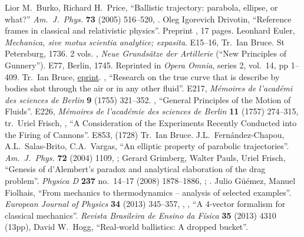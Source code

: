 \begin{thebibliography}{99}\footnotesize%
\setlength{\itemsep}{0pt plus 0.3ex}%
\setlength{\parskip}{0pt}
  Lior M.~Burko, Richard H.~Price,
  ``Ballistic trajectory: parabola, ellipse, or what?''
  \emph{Am.\ J.\ Phys.} {\bf 73} (2005) 516--520,
  . 
  Oleg Igorevich Drivotin,
  ``Reference frames in classical and relativistic physics''.
  Preprint , 17 pages.
  Leonhard Euler, 
  \emph{Mechanica, sive motus scientia analytice; expasita}.
  E15--16,
  Tr.\ Ian Bruce. St Petersburg, 1736. 2 vols.
  \bysame, 
  \emph{Neue Grunds\"atze der Artillerie} (``New Principles of Gunnery'').
  E77,
  Berlin, 1745. Reprinted in \emph{Opera Omnia}, series 2, vol.~14,
  pp 1--409. Tr.\ Ian Bruce, \href{http://www.17centurymaths.com/contents/eulerartillery.htm}{eprint}.
  \bysame, 
  ``Research on the true curve that is describe by bodies shot through
  the air or in any other fluid''.
  E217,
  \emph{M\'emoires de l'acad\'emi des sciences de Berlin}
  \textbf{9} (1755) 321--352.
  \bysame, 
  ``General Principles of the Motion of Fluids''.
  E226,
  \emph{M\'emoires de l'acad\'emie des sciences de Berlin}
  {\bf 11} (1757) 274--315, tr.~Uriel Frisch,
  \bysame,
  ``A Consideration of the Experiments Recently Conducted into the
  Firing of Cannons''.
  E853,
  (1728)
  Tr.\ Ian Bruce.
  J.L.~Fern\'andez-Chapou, A.L.~Salas-Brito, C.A.~Vargas,
  ``An elliptic property of parabolic trajectories''.
  \emph{Am.\ J.\ Phys.} \textbf{72} (2004) 1109,
  ;
  Gerard Grimberg, Walter Pauls, Uriel Frisch,
  ``Genesis of d'Alembert's paradox and analytical elaboration of the drag problem''.
  \emph{Physica D} {\bf237} no.~14--17 (2008) 1878--1886,
  ;
  .
  Julio G\"u\'emez, Manuel Fiolhais,
  ``From mechanics to thermodynamics -- analysis of selected examples''.
  \emph{European Journal of Physics} {\bf 34} (2013) 345--357,
  \bysame, \bysame,
  ``A 4-vector formalism for classical mechanics''.
  \emph{Revista Brasileira de Ensino da F\'isica} \textbf{35} 
  (2013) 4310 (13pp), 
  David W.~Hogg, ``Real-world ballistics: A dropped bucket''.

\end{thebibliography}

